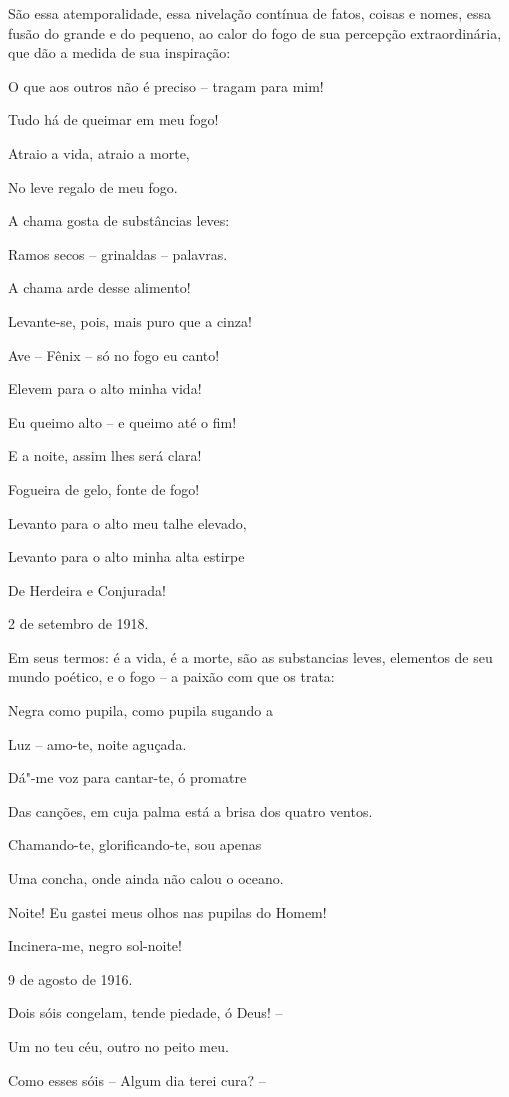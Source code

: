 São essa atemporalidade, essa nivelação contínua de fatos, coisas e
nomes, essa fusão do grande e do pequeno, ao calor do fogo de sua
percepção extraordinária, que dão a medida de sua inspiração:

O que aos outros não é preciso -- tragam para mim!

Tudo há de queimar em meu fogo!

Atraio a vida, atraio a morte,

No leve regalo de meu fogo.

A chama gosta de substâncias leves:

Ramos secos -- grinaldas -- palavras.

A chama arde desse alimento!

Levante-se, pois, mais puro que a cinza!

Ave -- Fênix -- só no fogo eu canto!

Elevem para o alto minha vida!

Eu queimo alto -- e queimo até o fim!

E a noite, assim lhes será clara!

Fogueira de gelo, fonte de fogo!

Levanto para o alto meu talhe elevado,

Levanto para o alto minha alta estirpe

De Herdeira e Conjurada!

2 de setembro de 1918.

Em seus termos: é a vida, é a morte, são as substancias leves, elementos
de seu mundo poético, e o fogo -- a paixão com que os trata:

Negra como pupila, como pupila sugando a

Luz -- amo-te, noite aguçada.

Dá"-me voz para cantar-te, ó promatre

Das canções, em cuja palma está a brisa dos quatro ventos.

Chamando-te, glorificando-te, sou apenas

Uma concha, onde ainda não calou o oceano.

Noite! Eu gastei meus olhos nas pupilas do Homem!

Incinera-me, negro sol-noite!

9 de agosto de 1916.

Dois sóis congelam, tende piedade, ó Deus! --

Um no teu céu, outro no peito meu.

Como esses sóis -- Algum dia terei cura? --

